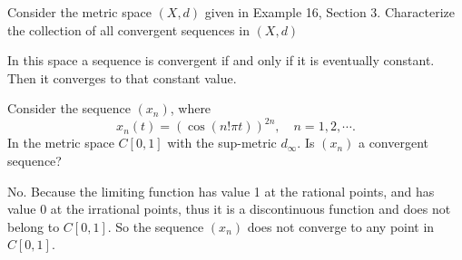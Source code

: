 \begin{problem}
	Consider the metric space $ (X,d) $ given in Example 16, Section 3. Characterize the collection of all convergent sequences in $ (X,d) $
\end{problem}

\begin{solution}
	In this space a sequence is convergent if and only if it is eventually constant. Then it converges to that constant value.
\end{solution}


\begin{problem}
	Consider the sequence $ (x_n) $, where 
	\[ x_n(t) = (\cos(n!\pi t))^{2n}, \quad n=1,2,\cdots. \]
	In the metric space $ C[0,1] $ with the sup-metric $ d_\infty $. Is $ (x_n) $ a convergent sequence?
\end{problem}
\begin{solution}
	No. Because the limiting function has value 1 at the rational points, and has value 0 at the irrational points, thus it is a discontinuous function and does not belong to $ C[0,1] $. So the sequence $ (x_n) $ does not converge to any point in $ C[0,1] $.
\end{solution}






